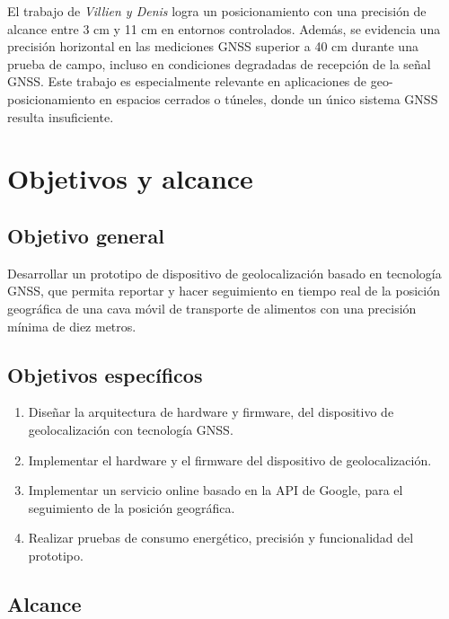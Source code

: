 El trabajo de \textit{Villien y Denis} logra un posicionamiento con una precisión de alcance entre 3 cm y 11 cm en entornos controlados. Además, se evidencia una precisión horizontal en las mediciones GNSS superior a 40 cm durante una prueba de campo, incluso en condiciones degradadas de recepción de la señal GNSS. Este trabajo es especialmente relevante en aplicaciones de geo-posicionamiento en espacios cerrados o túneles, donde un único sistema GNSS resulta insuficiente. 





\section{Objetivos y alcance}
\label{sec:objetivos}

\subsection{Objetivo general} 

Desarrollar un prototipo de dispositivo de geolocalización basado en tecnología GNSS, que permita reportar y hacer seguimiento en tiempo real de la posición geográfica de una cava móvil de transporte de alimentos con una precisión mínima de diez metros.


\subsection{Objetivos específicos} 

\begin{enumerate}
    \item Diseñar la arquitectura de hardware y firmware, del dispositivo de geolocalización con tecnología GNSS. 
    \item Implementar el hardware y el firmware del dispositivo de geolocalización.
    \item Implementar un servicio online basado en la API de Google, para el seguimiento de la posición geográfica.
    \item Realizar pruebas de consumo energético, precisión y funcionalidad del prototipo.
\end{enumerate}


\subsection{Alcance} 

